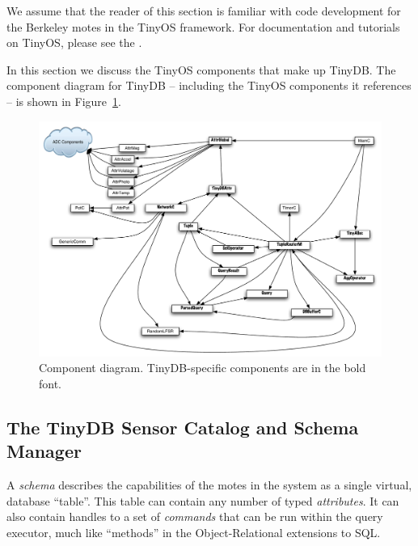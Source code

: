 \documentclass[11pt]{article}
\begin{document}
We assume that the reader of this section is familiar with code
development for the Berkeley motes in the
TinyOS framework.  For documentation and tutorials on
TinyOS, please see the .

In this section we discuss the TinyOS components that
make up TinyDB.  The component diagram for TinyDB --
including the TinyOS components it references -- is shown in
Figure~\ref{fig:components}.

\begin{figure}[ht]
\includegraphics[width=6in]{circuit}
\caption{Component diagram.  TinyDB-specific components are in the
  bold font.}
\label{fig:components}
\end{figure}

\subsection {The TinyDB Sensor Catalog and Schema Manager}
\label{sec:catalog}

A {\em schema} describes the capabilities of the motes in the system as a
single virtual, database ``table''.  This table can contain any number
of typed {\em attributes}.  It can also contain handles to a set of
{\em commands} that can be run within the query executor, much like ``methods'' in the Object-Relational
extensions to SQL.
\end{document}
